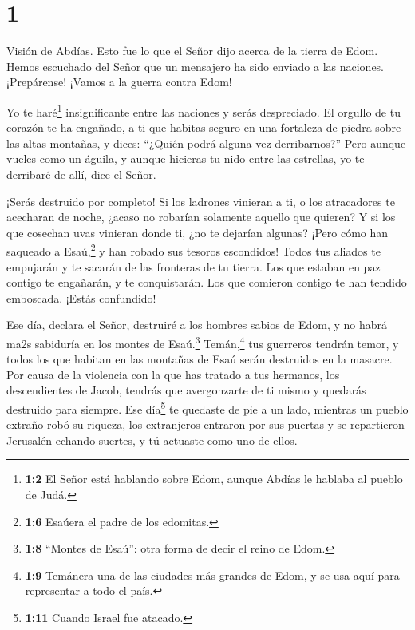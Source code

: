 \hypertarget{section}{%
\section{1}\label{section}}

 Visión de Abdías. Esto fue lo que el Señor dijo acerca de
la tierra de Edom. Hemos escuchado del Señor que un mensajero ha sido
enviado a las naciones. ¡Prepárense! ¡Vamos a la guerra contra Edom!

 Yo te haré\footnote{\textbf{1:2} El Señor está hablando
  sobre Edom, aunque Abdías le hablaba al pueblo de Judá.}
insignificante entre las naciones y serás despreciado.  El
orgullo de tu corazón te ha engañado, a ti que habitas seguro en una
fortaleza de piedra sobre las altas montañas, y dices: ``¿Quién podrá
alguna vez derribarnos?''  Pero aunque vueles como un
águila, y aunque hicieras tu nido entre las estrellas, yo te derribaré
de allí, dice el Señor.

 ¡Serás destruido por completo! Si los ladrones vinieran a
ti, o los atracadores te acecharan de noche, ¿acaso no robarían
solamente aquello que quieren? Y si los que cosechan uvas vinieran donde
ti, ¿no te dejarían algunas?  ¡Pero cómo han saqueado a
Esaú,\footnote{\textbf{1:6} Esaúera el padre de los edomitas.} y han
robado sus tesoros escondidos!  Todos tus aliados te
empujarán y te sacarán de las fronteras de tu tierra. Los que estaban en
paz contigo te engañarán, y te conquistarán. Los que comieron contigo te
han tendido emboscada. ¡Estás confundido!

 Ese día, declara el Señor, destruiré a los hombres sabios
de Edom, y no habrá ma2s sabiduría en los montes de Esaú.\footnote{\textbf{1:8}
  ``Montes de Esaú'': otra forma de decir el reino de Edom.}
 Temán,\footnote{\textbf{1:9} Temánera una de las ciudades
  más grandes de Edom, y se usa aquí para representar a todo el país.}
tus guerreros tendrán temor, y todos los que habitan en las montañas de
Esaú serán destruidos en la masacre.  Por causa de la
violencia con la que has tratado a tus hermanos, los descendientes de
Jacob, tendrás que avergonzarte de ti mismo y quedarás destruido para
siempre.  Ese día\footnote{\textbf{1:11} Cuando Israel fue
  atacado.} te quedaste de pie a un lado, mientras un pueblo extraño
robó su riqueza, los extranjeros entraron por sus puertas y se
repartieron Jerusalén echando suertes, y tú actuaste como uno de ellos.

